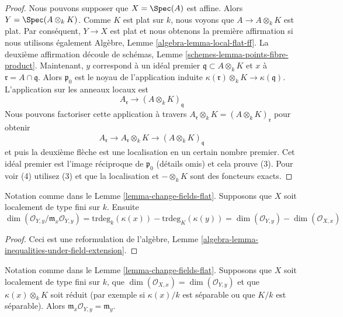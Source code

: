\begin{proof}
Nous pouvons supposer que $X = \Spec(A)$ est affine. Alors $Y =
\Spec(A \otimes_k K)$. Comme $K$ est plat sur $k$, nous voyons
que $A \to A \otimes_k K$ est plat. Par conséquent, $Y \to X$
est plat et nous obtenons la première affirmation si nous
utilisons également Algèbre, Lemme
\ref{algebra-lemma-local-flat-ff}. La deuxième affirmation découle de
schémas, Lemme \ref{schemes-lemma-points-fibre-product}. Maintenant,
$y$ correspond à un idéal premier $\mathfrak q \subset A \otimes_k
K$ et $x$ à $\mathfrak r = A \cap \mathfrak q$. Alors $\mathfrak p_0$
est le noyau de l'application induite $\kappa(\mathfrak r) \otimes_k
K \to \kappa(\mathfrak q)$. L'application sur les anneaux locaux est
$$
A_\mathfrak r \longrightarrow (A \otimes_k K)_\mathfrak q
$$
Nous pouvons factoriser cette application
à travers $A_\mathfrak r \otimes_k K = (A
\otimes_k K)_{\mathfrak r}$ pour obtenir
$$
A_\mathfrak r \longrightarrow A_\mathfrak r \otimes_k K
\longrightarrow (A \otimes_k K)_\mathfrak q
$$
et puis la deuxième flèche est une localisation en un certain
nombre premier. Cet idéal premier est l'image réciproque de
$\mathfrak p_0$ (détails omis) et cela prouve (3). Pour voir (4) utilisez
(3) et que la localisation et $- \otimes_k K$ sont des foncteurs exacts.
\end{proof}

\begin{lemma}
\label{lemma-change-fields-algebraic-dim}
Notation comme dans le Lemme \ref{lemma-change-fields-flat}.
Supposons que $X$ soit localement de type fini sur $k$. Ensuite
$$
\dim(\mathcal{O}_{Y, y}/\mathfrak m_x\mathcal{O}_{Y, y}) =
\text{trdeg}_k(\kappa(x)) - \text{trdeg}_K(\kappa(y)) =
\dim(\mathcal{O}_{Y, y}) - \dim(\mathcal{O}_{X, x})
$$
\end{lemma}

\begin{proof}
Ceci est une reformulation de l'algèbre, Lemme
\ref{algebra-lemma-inequalities-under-field-extension}.
\end{proof}

\begin{lemma}
\label{lemma-change-fields-algebraic-unramified}
Notation comme dans le Lemme
\ref{lemma-change-fields-flat}. Supposons que $X$ soit
localement de type fini sur $k$, que $\dim(\mathcal{O}_{X, x}) =
\dim(\mathcal{O}_{Y, y})$ et que $\kappa(x) \otimes_k K$ soit
réduit (par exemple si $\kappa(x)/k$ est séparable ou que $K/k$ est
séparable). Alors $\mathfrak m_x \mathcal{O}_{Y, y} = \mathfrak m_y$.
\end{lemma}


